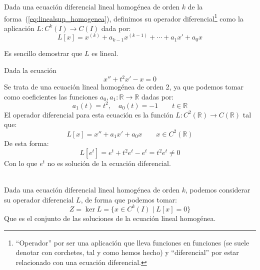\begin{definicion}
    Dada una ecuación diferencial lineal homogénea de orden $k$ de la forma~(\ref{eq:linealsup_homogenea}), definimos su operador diferencial\footnote{``Operador'' por ser una aplicación que lleva funciones en funciones (se suele denotar con corchetes, tal y como hemos hecho) y ``diferencial'' por estar relacionado con una ecuación diferencial.} como la aplicación $L:C^k(I)\rightarrow C(I)$ dada por:
    \begin{equation*}
        L[x] = x^{(k)} + a_{k-1}x^{(k-1)} + \cdots + a_1x' + a_0x
    \end{equation*}
\end{definicion}
Es sencillo demostrar que $L$ es lineal.

\begin{ejemplo}
    Dada la ecuación
    \begin{equation*}
        x'' + t^2 x' - x = 0
    \end{equation*}
    Se trata de una ecuación lineal homogénea de orden 2, ya que podemos tomar como coeficientes las funciones $a_0,a_1:\mathbb{R}\rightarrow\mathbb{R}$ dadas por:
    \begin{equation*}
        a_1(t) = t^2, \quad a_0(t) = -1 \qquad t\in \mathbb{R}
    \end{equation*}
    El operador diferencial para esta ecuación es la función $L:C^2(\mathbb{R})\rightarrow C(\mathbb{R})$ tal que:
    \begin{equation*}
        L[x] = x'' + a_1 x' + a_0 x \qquad x\in C^2(\mathbb{R})
    \end{equation*}
    De esta forma:
    \begin{equation*}
        L[e^t] = e^t + t^2 e^t - e^t = t^2 e^t \neq 0
    \end{equation*}
    Con lo que $e^t$ no es solución de la ecuación diferencial.
\end{ejemplo}~\\

\noindent
Dada una ecuación diferencial lineal homogénea de orden $k$, podemos considerar su operador diferencial $L$, de forma que podemos tomar:
\begin{equation*}
    Z = \ker L =  \{x \in C^k(I) \mid L[x] = 0\}
\end{equation*}
Que es el conjunto de las soluciones de la ecuación lineal homogénea.


